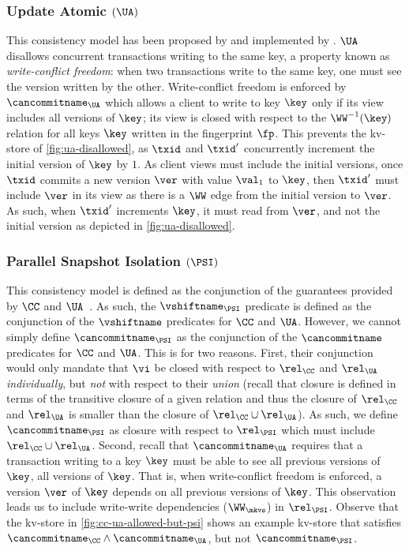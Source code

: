 \subsubsection{Update Atomic \((\UA)\)}
This consistency model has been proposed by \citet{framework-concur} 
and implemented by \citet{rola}.
\(\UA\) disallows concurrent transactions writing to the same key,
a property known as \emph{write-conflict freedom}:  
when two transactions write to the same key, one must see the version 
written by the other.
Write-conflict freedom is enforced by \(\cancommitname_{\UA}\) which allows a client to write to key \(\key\) only if its view includes all versions of \(\key\); 
\ie its view is closed with respect to the \(\WW^{-1}(\key)\) relation for all keys \(\key\) written in the fingerprint \(\fp\).
This prevents the kv-store of \cref{fig:ua-disallowed},
as \(\txid\) and \(\txid'\) concurrently increment the initial version of \(\key\) by \(1\).
As client views must include the initial versions, once \(\txid\) commits a new version \(\ver\) with value \(\val_1\) to \(\key\), then \(\txid'\) must include \(\ver\) in its view as there is a \(\WW\) edge from the initial version to \(\ver\). 
As such, when \(\txid'\) %
increments \(\key\), it must read from \(\ver\), and not the initial version as depicted in \cref{fig:ua-disallowed}.



\subsubsection{Parallel Snapshot Isolation \((\PSI)\)} 
This consistency model is defined as the conjunction of the guarantees provided by \(\CC\) and \(\UA\)~\cite{framework-concur}. 
As such, the \(\vshiftname_{\PSI}\) predicate is defined as the conjunction of the \(\vshiftname\) predicates for \(\CC\) and \(\UA\).
However, we cannot simply define \(\cancommitname_{\PSI}\) as the conjunction of the \(\cancommitname\) predicates for \(\CC\) and \(\UA\). 
This is for two reasons. 
First, their conjunction would only mandate that \(\vi\) be closed with respect to 
\(\rel_{\CC}\) and \(\rel_{\UA}\) \emph{individually}, but \emph{not} with respect to their \emph{union} (recall that closure is defined in terms of the transitive closure of a given relation and thus the closure of \(\rel_{\CC}\) and \(\rel_{\UA}\) is smaller than the closure of \(\rel_{\CC} \cup \rel_{\UA}\)).
As such, we define \(\cancommitname_{\PSI}\) as closure with respect to \(\rel_{\PSI}\) which must include \(\rel_{\CC} \cup \rel_{\UA}\).
Second, recall that \(\cancommitname_{\UA}\) requires that a transaction writing 
to a key \(\key\) must be able to see all previous versions of \(\key\), \ie all versions of \(\key\). 
That is, when write-conflict freedom is enforced, a version \(\ver\) of \(\key\) depends on all 
previous versions of \(\key\). 
This observation leads us to include write-write dependencies (\(\WW_{\mkvs}\)) in \(\rel_{\PSI}\). 
Observe that the kv-store in \cref{fig:cc-ua-allowed-but-psi} shows an example kv-store that satisfies \(\cancommitname_{\CC} \land \cancommitname_{\UA}\), 
but not \(\cancommitname_{\PSI}\).

